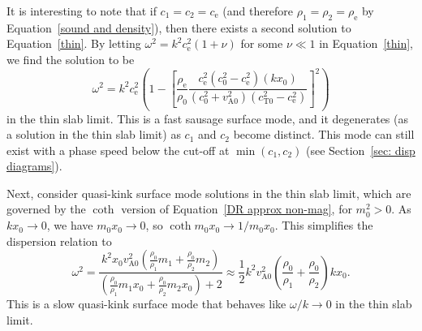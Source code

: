 \documentclass[12pt]{../style-files/ociamthesis}
\begin{document}
It is interesting to note that if $c_1 = c_2 = c_\textrm{e}$ (and therefore $\rho_1 = \rho_2 = \rho_\textrm{e}$ by Equation~\eqref{sound and density}), then there exists a second solution to Equation~\eqref{thin}. By letting $\omega^2 = k^2c_\textrm{e}^2(1 + \nu)$ for some $\nu \ll 1$ in Equation~\eqref{thin}, we find the solution to be
\begin{equation}
\omega^2 = k^2c_\textrm{e}^2\left(1 - \left[\frac{\rho_\textrm{e}}{\rho_0}\frac{c_\textrm{e}^2(c_0^2 - c_\textrm{e}^2)(kx_0)}{(c_0^2 + v_\textrm{A0}^2)(c_\textrm{T0}^2 - c_\textrm{e}^2)}\right]^2\right)
\label{thin slab fast saus surf}
\end{equation}
in the thin slab limit. This is a fast sausage surface mode, and it degenerates (as a solution in the thin slab limit) as $c_1$ and $c_2$ become distinct. This mode can still exist with a phase speed below the cut-off at $\min(c_1, c_2)$ (see Section~\ref{sec: disp diagrams}).

Next, consider quasi-kink surface mode solutions in the thin slab limit, which are governed by the $\coth$ version of Equation~\eqref{DR approx non-mag}, for $m_0^2 > 0$. As $kx_0 \to 0$, we have $m_0x_0 \to 0$, so $\coth{m_0x_0} \to 1/m_0x_0$. This simplifies the dispersion relation to
\begin{equation}
\omega^2 = \frac{k^2x_0v_\textrm{A0}^2\left(\frac{\rho_0}{\rho_1}m_1 + \frac{\rho_0}{\rho_2}m_2\right)}{\left(\frac{\rho_0}{\rho_1}m_1x_0 + \frac{\rho_0}{\rho_2}m_2x_0\right) + 2} \approx \frac{1}{2}k^2v_\textrm{A0}^2\left(\frac{\rho_0}{\rho_1} + \frac{\rho_0}{\rho_2}\right)kx_0.
\label{thin slab slow kink surf}
\end{equation}
This is a slow quasi-kink surface mode that behaves like $\omega/k \to 0$ in the thin slab limit.
\end{document}
